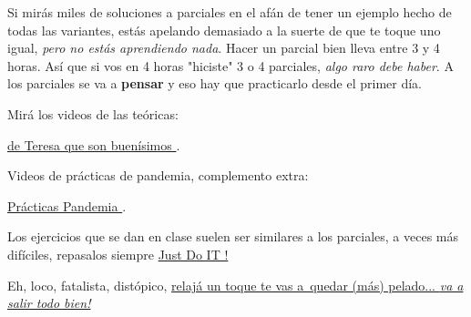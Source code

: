 {\begin{minipage}{0.7\textwidth}
    Si mirás miles de soluciones a parciales en el afán de tener un ejemplo hecho de todas las
    variantes, estás apelando demasiado a la suerte de que te toque uno igual, \textit{pero no estás aprendiendo nada}.
    Hacer un parcial bien lleva entre 3 y 4 horas. Así que si vos en 4 horas "hiciste" 3 o 4 parciales, \textit{algo raro debe haber}.
    A los parciales se va a \textbf{pensar} y eso hay que practicarlo desde el primer día.\par\bigskip

    Mirá los videos de las teóricas:

          \href{\videosTeresa}{de Teresa que son buenísimos }.

          \medskip

    Videos de prácticas de pandemia, complemento extra:

          \href{\videosPracticas}{Prácticas Pandemia }.
          
          \bigskip

    Los ejercicios que se dan en clase suelen ser similares a los parciales,
    a veces más difíciles, repasalos siempre \href{\justDoIt}{Just Do IT !}
  \end{minipage}
}
\vspace*{\fill}

Eh, loco, fatalista, distópico, \href{\dontWorryAboutAThing}{relajá un toque te vas a\
  quedar (más) pelado...  \textit{va a salir todo bien!}}

